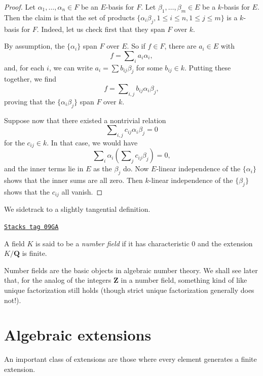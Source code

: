 \begin{proof}
Let $\alpha_1, \ldots, \alpha_n \in F$ be an $E$-basis for $F$. Let
$\beta_1, \ldots, \beta_m \in E$ be a $k$-basis for $E$. Then the claim is
that the set of products
$\{\alpha_i \beta_j, 1 \leq i \leq n, 1 \leq j \leq m\}$
is a $k$-basis for $F$. Indeed, let us check first that they span $F$ over $k$.

\medskip\noindent
By assumption, the $\{\alpha_i\}$ span $F$ over $E$. So if
$f \in F$, there are $a_i \in E$ with
$$
f = \sum\nolimits_i a_i \alpha_i,
$$
and, for each $i$, we can write $a_i = \sum b_{ij} \beta_j$ for some
$b_{ij} \in k$. Putting these together, we find
$$
f = \sum\nolimits_{i,j} b_{ij} \alpha_i \beta_j,
$$
proving that the $\{\alpha_i \beta_j\}$ span $F$ over $k$.

\medskip\noindent
Suppose now that there existed a nontrivial relation
$$
\sum\nolimits_{i,j} c_{ij} \alpha_i \beta_j = 0
$$
for the $c_{ij} \in k$. In that case, we would have
$$
\sum\nolimits_i \alpha_i \left( \sum\nolimits_j c_{ij} \beta_j \right) = 0,
$$
and the inner terms lie in $E$ as the $\beta_j$ do. Now $E$-linear
independence of the $\{\alpha_i\}$ shows that the inner sums are all zero.
Then $k$-linear independence of the $\{\beta_j\}$ shows that the
$c_{ij}$ all vanish.
\end{proof}

We sidetrack to a slightly tangential definition.

\begin{definition}
\label{fields-definition-number-field}
\href{https://stacks.math.columbia.edu/tag/09GA}{\texttt{Stacks tag 09GA}}

A field $K$ is said to be a {\it number field} if it has characteristic
$0$ and the extension $K/\mathbf{Q}$ is finite.
\end{definition}

Number fields are the basic objects in algebraic number theory. We shall see
later that,
for the analog of the integers $\mathbf{Z}$ in a number field, something kind
of like unique factorization still holds (though strict unique factorization
generally does not!).

\section{Algebraic extensions}
\label{fields-section-algebraic-extensions}
An important class of extensions are those where every element generates
a finite extension.

